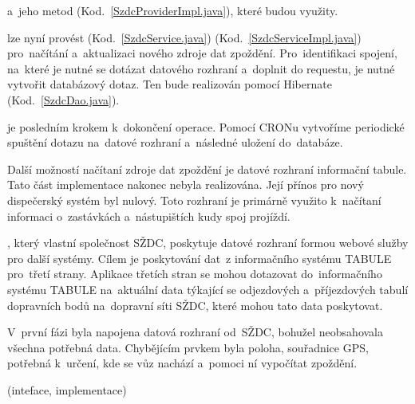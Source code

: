 
 a~jeho metod (Kod.~\ref{SzdcProviderImpl.java}), které budou využity.


 lze nyní provést (Kod.~\ref{SzdcService.java}) (Kod.~\ref{SzdcServiceImpl.java}) pro~načítání a~aktualizaci nového zdroje dat zpoždění. Pro~identifikaci spojení, na~které je nutné se dotázat datového rozhraní a~doplnit do requestu, je nutné vytvořit databázový dotaz. Ten bude realizován pomocí Hibernate (Kod.~\ref{SzdcDao.java}).


 je posledním krokem k~dokončení operace. Pomocí CRONu vytvoříme periodické spuštění dotazu na~datové rozhraní a~následné uložení do~databáze.



Další možností načítaní zdroje dat zpoždění je datové rozhraní informační tabule. Tato část implementace nakonec nebyla realizována. Její přínos pro nový dispečerský systém byl nulový. Toto rozhraní je primárně  využito k~načítaní informaci o~zastávkách a~nástupištích kudy spoj projíždí.

, který vlastní společnost SŽDC, poskytuje datové rozhraní formou webové služby pro další systémy. Cílem je poskytování dat~z informačního systému TABULE pro~třetí strany. Aplikace třetích stran se mohou dotazovat do~informačního systému TABULE na~aktuální data týkající se odjezdových a~příjezdových tabulí dopravních bodů na~dopravní síti SŽDC, které mohou tato data poskytovat.

V~první fázi byla napojena datová rozhraní od~SŽDC, bohužel neobsahovala všechna potřebná data. Chybějícím prvkem byla poloha, souřadnice GPS, potřebná k~určení, kde se vůz nachází a~pomoci ní vypočítat zpoždění.

 (inteface, implementace)
	
	
